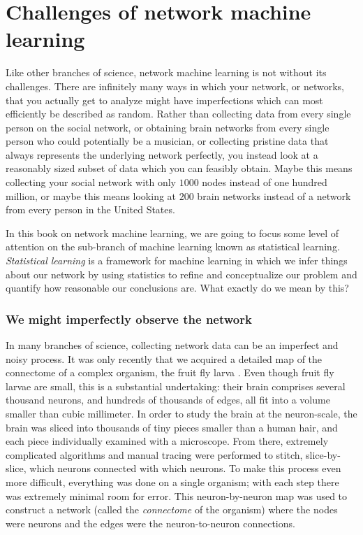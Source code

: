 \section{Challenges of network machine learning}
\label{sec:ch1:challenges}

Like other branches of science, network machine learning is not without its challenges. There are infinitely many ways in which your network, or networks, that you actually get to analyze might have imperfections which can most efficiently be described as random. Rather than collecting data from every single person on the social network, or obtaining brain networks from every single person who could {potentially} be a musician, or collecting pristine data that always represents the underlying network perfectly, you instead look at a reasonably sized subset of data which you can feasibly obtain. Maybe this means collecting your social network with only $1000$ nodes instead of one hundred million, or maybe this means looking at $200$ brain networks instead of a network from every person in the United States.

In this book on network machine learning, we are going to focus some level of attention on the sub-branch of machine learning known as statistical learning. \textit{Statistical learning} is a framework for machine learning in which we {infer} things about our network by using statistics to refine and conceptualize our problem and quantify how reasonable our conclusions are. What exactly do we mean by this?

\subsubsection{We might imperfectly observe the network}

In many branches of science, collecting network data can be an imperfect and noisy process. It was only recently that we acquired a detailed map of the connectome of a complex organism, the fruit fly larva \cite{Winding2023Mar}. Even though fruit fly larvae are small, this is a substantial undertaking: their brain comprises several thousand neurons, and hundreds of thousands of edges, all fit into a volume smaller than cubic millimeter. In order to study the brain at the neuron-scale, the brain was sliced into thousands of tiny pieces smaller than a human hair, and each piece individually examined with a microscope. From there, extremely complicated algorithms and manual tracing were performed to stitch, slice-by-slice, which neurons connected with which neurons. To make this process even more difficult, everything was done on a single organism; with each step there was extremely minimal room for error. This neuron-by-neuron map was used to construct a network (called the \textit{connectome} of the organism) where the nodes were neurons and the edges were the neuron-to-neuron connections.

